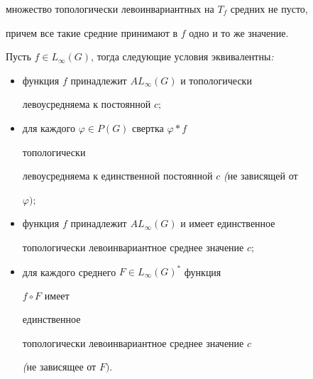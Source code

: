 множество топологически левоинвариантных на $T_f$ средних не пусто,


причем все такие средние принимают в $f$ одно и то же значение.





\begin{thms}


Пусть $f\in L_\infty(G)$, тогда следующие условия эквивалентны{\em :}


\begin{itemize}


\item[1)] функция $f$ принадлежит $AL_\infty(G)$ и топологически


левоусредняема к постоянной $c;$


\item[2)] для каждого $\varphi\in P(G)$ свертка $\varphi\ast f$


топологически


левоусредняема к единственной постоянной $c$ {\em (}не зависящей от


$\varphi);$


\item[3)] функция $f$ принадлежит $AL_\infty(G)$ и имеет единственное


топологически левоинвариантное среднее значение $c;$


\item[4)] для каждого среднего $F\in L_\infty(G)^*$ функция


$f\circ F$ имеет


единственное


топологически левоинвариантное среднее значение $c$


{\em (}не зависящее от $F)$.


\end{itemize}


\end{thms}





